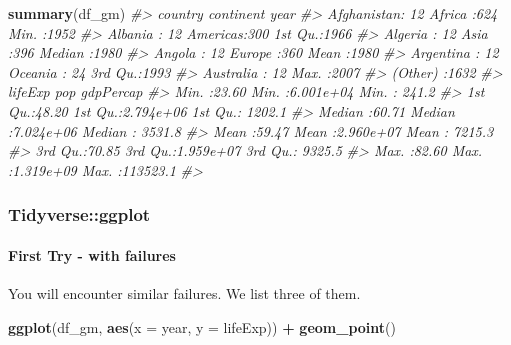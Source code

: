 \documentclass[
  xelatex, ja=standard]{bxjsbook}
\newenvironment{Shaded}{\begin{snugshade}}{\end{snugshade}}
\newcommand{\AttributeTok}[1]{\textcolor[rgb]{0.13,0.29,0.53}{#1}}
\newcommand{\CommentTok}[1]{\textcolor[rgb]{0.56,0.35,0.01}{\textit{#1}}}
\newcommand{\FunctionTok}[1]{\textcolor[rgb]{0.13,0.29,0.53}{\textbf{#1}}}
\newcommand{\NormalTok}[1]{#1}
\newcommand{\SpecialCharTok}[1]{\textcolor[rgb]{0.81,0.36,0.00}{\textbf{#1}}}
\theoremstyle{definition}
\theoremstyle{definition}
\theoremstyle{definition}
\theoremstyle{definition}
\theoremstyle{remark}
\begin{document}
\begin{Shaded}
\begin{Highlighting}[]
\FunctionTok{summary}\NormalTok{(df\_gm)}
\CommentTok{\#\textgreater{}         country        continent        year     }
\CommentTok{\#\textgreater{}  Afghanistan:  12   Africa  :624   Min.   :1952  }
\CommentTok{\#\textgreater{}  Albania    :  12   Americas:300   1st Qu.:1966  }
\CommentTok{\#\textgreater{}  Algeria    :  12   Asia    :396   Median :1980  }
\CommentTok{\#\textgreater{}  Angola     :  12   Europe  :360   Mean   :1980  }
\CommentTok{\#\textgreater{}  Argentina  :  12   Oceania : 24   3rd Qu.:1993  }
\CommentTok{\#\textgreater{}  Australia  :  12                  Max.   :2007  }
\CommentTok{\#\textgreater{}  (Other)    :1632                                }
\CommentTok{\#\textgreater{}     lifeExp           pop              gdpPercap       }
\CommentTok{\#\textgreater{}  Min.   :23.60   Min.   :6.001e+04   Min.   :   241.2  }
\CommentTok{\#\textgreater{}  1st Qu.:48.20   1st Qu.:2.794e+06   1st Qu.:  1202.1  }
\CommentTok{\#\textgreater{}  Median :60.71   Median :7.024e+06   Median :  3531.8  }
\CommentTok{\#\textgreater{}  Mean   :59.47   Mean   :2.960e+07   Mean   :  7215.3  }
\CommentTok{\#\textgreater{}  3rd Qu.:70.85   3rd Qu.:1.959e+07   3rd Qu.:  9325.5  }
\CommentTok{\#\textgreater{}  Max.   :82.60   Max.   :1.319e+09   Max.   :113523.1  }
\CommentTok{\#\textgreater{} }
\end{Highlighting}
\end{Shaded}

\hypertarget{tidyverseggplot}{%
\subsubsection{Tidyverse::ggplot}\label{tidyverseggplot}}

\hypertarget{first-try---with-failures}{%
\paragraph{First Try - with failures}\label{first-try---with-failures}}

You will encounter similar failures. We list three of them.

\begin{Shaded}
\begin{Highlighting}[]
\FunctionTok{ggplot}\NormalTok{(df\_gm, }\FunctionTok{aes}\NormalTok{(}\AttributeTok{x =}\NormalTok{ year, }\AttributeTok{y =}\NormalTok{ lifeExp)) }\SpecialCharTok{+} \FunctionTok{geom\_point}\NormalTok{()}
\end{Highlighting}
\end{Shaded}
\end{document}
